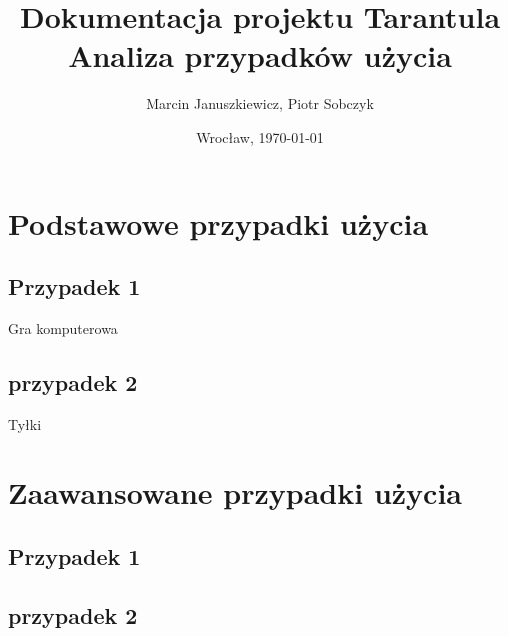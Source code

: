 \documentclass[11pt,leqno]{article}
\title{\LARGE Dokumentacja projektu \textbf{Tarantula}\\
							Analiza przypadków użycia}
\author{Marcin Januszkiewicz, Piotr Sobczyk}
\date{Wrocław, \today}
\begin{document}
\maketitle 
\thispagestyle{empty}
\newpage
\tableofcontents
\newpage

\section{Podstawowe przypadki użycia}

\subsection{Przypadek 1}
Gra komputerowa
\subsection{przypadek 2}
Tyłki
\section{Zaawansowane przypadki użycia}

\subsection{Przypadek 1}

\subsection{przypadek 2}
\end{document}
